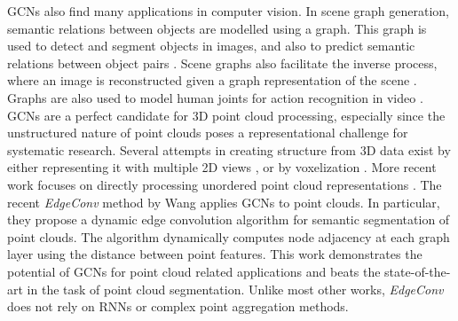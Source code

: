 \documentclass[10pt,twocolumn,letterpaper]{article}
\begin{document}
GCNs also find many applications in computer vision. In scene graph generation, semantic relations between objects are modelled using a graph. This graph is used to detect and segment objects in images, and also to predict semantic relations between object pairs \cite{qi20173d,cv_scene_xu2017scene,cv_scene_yang2018graph,cv_scene_li2018factorizable}. Scene graphs also facilitate the inverse process, where an image is reconstructed given a graph representation of the scene \cite{cv_inv_scene_johnson2018image}. Graphs are also used to model human joints for action recognition in video \cite{cv_action_yan2018spatial,cv_action_jain2016structural}.  
GCNs are a perfect candidate for 3D point cloud processing, especially since the unstructured nature of point clouds poses a representational challenge for systematic research. Several attempts in creating structure from 3D data exist by either representing it with multiple 2D views \cite{mv_su2015multi,mv_guerry2017snapnet,mv_boulch2017unstructured,mv_li2016lstm}, or by voxelization \cite{voxel_dai2017scannet,voxel_mv_qi2016volumetric,voxel_riegler2017octnet,voxel_tchapmi2017segcloud}. More recent work focuses on directly processing unordered point cloud representations \cite{pc_qi2017pointnet,pc_qi2017pointnet++, 3dsemseg_ICCVW17,pc_huang2018recurrent,pc_ye20183d}. The recent \emph{EdgeConv} method by Wang \etal \cite{wang2018dynamic} applies GCNs to point clouds. In particular, they propose a dynamic edge convolution algorithm for semantic segmentation of point clouds. The algorithm dynamically computes node adjacency at each graph layer using the distance between point features. This work demonstrates the potential of GCNs for point cloud related applications and beats the state-of-the-art in the task of point cloud segmentation. Unlike most other works, \emph{EdgeConv} does not rely on RNNs or complex point aggregation methods. 
\end{document}
